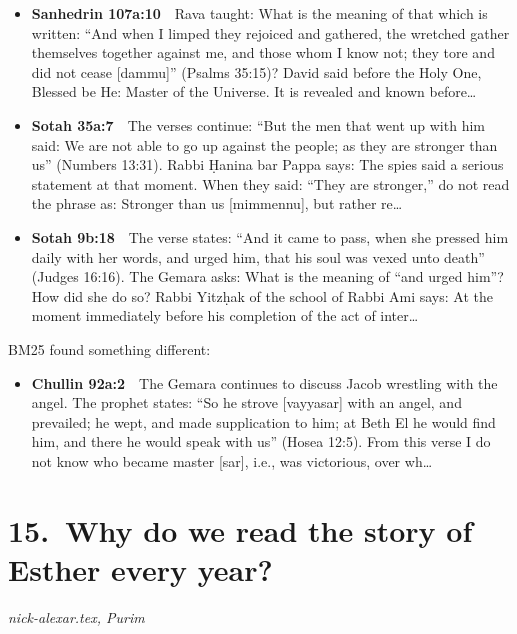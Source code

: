 \documentclass[11pt,a4paper]{article}
\begin{document}
\begin{itemize}[leftmargin=1.2em,itemsep=3pt]
\item {\color{ref}\textbf{Sanhedrin 107a:10}}\ \ Rava taught: What is the meaning of that which is written: “And when I limped they rejoiced and gathered, the wretched gather themselves together against me, and those whom I know not; they tore and did not cease [dammu]” (Psalms 35:15)? David said before the Holy One, Blessed be He: Master of the Universe. It is revealed and known before\ldots
\item {\color{ref}\textbf{Sotah 35a:7}}\ \ The verses continue: “But the men that went up with him said: We are not able to go up against the people; as they are stronger than us” (Numbers 13:31). Rabbi Ḥanina bar Pappa says: The spies said a serious statement at that moment. When they said: “They are stronger,” do not read the phrase as: Stronger than us [mimmennu], but rather re\ldots
\item {\color{ref}\textbf{Sotah 9b:18}}\ \ The verse states: “And it came to pass, when she pressed him daily with her words, and urged him, that his soul was vexed unto death” (Judges 16:16). The Gemara asks: What is the meaning of “and urged him”? How did she do so? Rabbi Yitzḥak of the school of Rabbi Ami says: At the moment immediately before his completion of the act of inter\ldots
\end{itemize}
{\color{quiet}\small BM25 found something different:}
\begin{itemize}[leftmargin=1.2em]
\item {\color{ref}\textbf{Chullin 92a:2}}\ \ The Gemara continues to discuss Jacob wrestling with the angel. The prophet states: “So he strove [vayyasar] with an angel, and prevailed; he wept, and made supplication to him; at Beth El he would find him, and there he would speak with us” (Hosea 12:5). From this verse I do not know who became master [sar], i.e., was victorious, over wh\ldots
\end{itemize}

\section*{15.\ Why do we read the story of Esther every year?}
{\color{quiet}\small\textit{nick-alexar.tex, Purim}}
\end{document}
